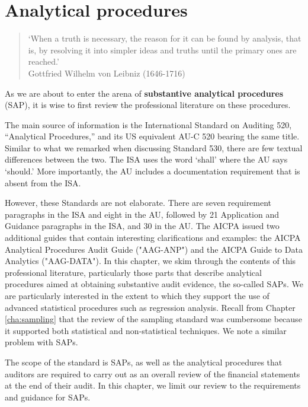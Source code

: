 \chapter{Analytical procedures} %
\label{cha:analytical_procedures}

\begin{quote}
`When a truth is necessary, the reason for it can be found by analysis, that is, by resolving it into simpler ideas and truths until the primary ones are reached.'\\
Gottfried Wilhelm von Leibniz (1646-1716)
\end{quote}

As we are about to enter the arena of \textbf{substantive analytical procedures} (SAP), it is wise to first review the professional literature on these procedures. 

The main source of information is the International Standard on Auditing 520, “Analytical Procedures,” and its US equivalent AU-C 520 bearing the same title. Similar to what we remarked when discussing Standard 530, there are few textual differences between the two. The ISA uses the word ‘shall’ where the AU says ‘should.’ More importantly, the AU includes a documentation requirement that is absent from the ISA.

However, these Standards are not elaborate. There are seven requirement paragraphs in the ISA and eight in the AU, followed by 21 Application and Guidance paragraphs in the ISA, and 30 in the AU. The AICPA issued two additional guides that contain interesting clarifications and examples: the AICPA Analytical Procedures Audit Guide ("AAG-ANP") and the AICPA Guide to Data Analytics ("AAG-DATA"). In this chapter, we skim through the contents of this professional literature, particularly those parts that describe analytical procedures aimed at obtaining substantive audit evidence, the so-called SAPs. We are particularly interested in the extent to which they support the use of advanced statistical procedures such as regression analysis. Recall from Chapter \ref{cha:sampling} that the review of the sampling standard was cumbersome because it supported both statistical and non-statistical techniques. We note a similar problem with SAPs.

The scope of the standard is SAPs, as well as the analytical procedures that auditors are required to carry out as an overall review of the financial statements at the end of their audit. In this chapter, we limit our review to the requirements and guidance for SAPs.

